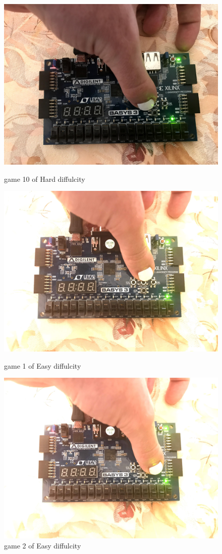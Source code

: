 \documentclass[11pt]{article}
\begin{document}
\begin{figure}[ht]
	\includegraphics{IMG_1310.JPG}
	\caption{game 10 of Hard diffulcity }
	\label{fig:sim_with_table}
	
	\includegraphics{IMG_1311.JPG}
	\caption{game 1 of Easy diffulcity }
	\label{fig:sim_with_table}
	
	\includegraphics{IMG_1312.JPG}
	\caption{game 2 of Easy diffulcity }
	\label{fig:sim_with_table}
	

\end{figure}
\end{document}
